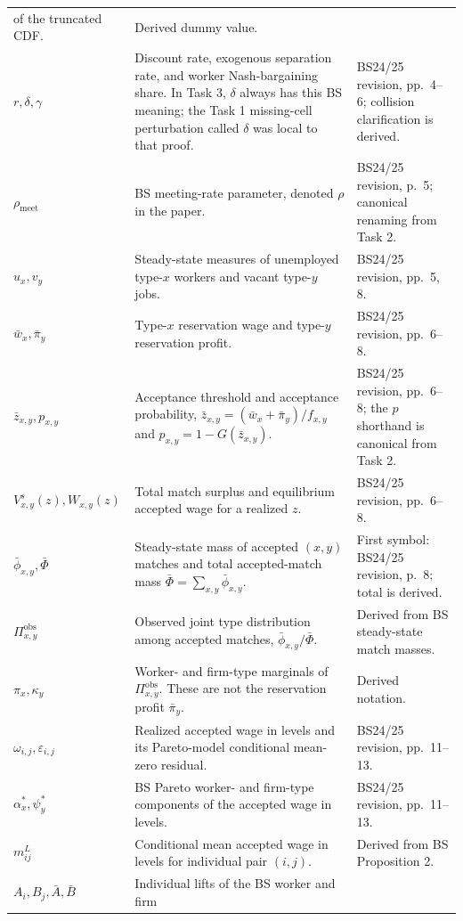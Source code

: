 \documentclass[11pt]{article}
\begin{document}
\begin{longtable}{p{}p{}p{}}
of the truncated CDF. & Derived dummy value. \\
\(r,\delta,\gamma\) & Discount rate, exogenous separation rate, and worker
Nash-bargaining share.  In Task 3, \(\delta\) always has this BS meaning; the
Task 1 missing-cell perturbation called \(\delta\) was local to that proof. &
BS24/25 revision, pp.\ 4--6; collision clarification is derived. \\
\(\rho_{\mathrm{meet}}\) & BS meeting-rate parameter, denoted \(\rho\) in
the paper. & BS24/25 revision, p.\ 5; canonical renaming from Task 2. \\
\(u_x,v_y\) & Steady-state measures of unemployed type-\(x\) workers and
vacant type-\(y\) jobs. & BS24/25 revision, pp.\ 5, 8. \\
\(\bar w_x,\bar\pi_y\) & Type-\(x\) reservation wage and type-\(y\)
reservation profit. & BS24/25 revision, pp.\ 6--8. \\
\(\bar z_{x,y},p_{x,y}\) & Acceptance threshold and acceptance probability,
\(\bar z_{x,y}=(\bar w_x+\bar\pi_y)/f_{x,y}\) and
\(p_{x,y}=1-G(\bar z_{x,y})\). & BS24/25 revision, pp.\ 6--8; the \(p\)
shorthand is canonical from Task 2. \\
\(V^s_{x,y}(z),W_{x,y}(z)\) & Total match surplus and equilibrium accepted
wage for a realized \(z\). & BS24/25 revision, pp.\ 6--8. \\
\(\bar\phi_{x,y},\bar\Phi\) & Steady-state mass of accepted \((x,y)\)
matches and total accepted-match mass
\(\bar\Phi=\sum_{x,y}\bar\phi_{x,y}\). & First symbol: BS24/25 revision,
p.\ 8; total is derived. \\
\(\Pi^{\mathrm{obs}}_{x,y}\) & Observed joint type distribution among
accepted matches, \(\bar\phi_{x,y}/\bar\Phi\). & Derived from BS steady-state
match masses. \\
\(\pi_x,\kappa_y\) & Worker- and firm-type marginals of
\(\Pi^{\mathrm{obs}}_{x,y}\).  These are not the reservation profit
\(\bar\pi_y\). & Derived notation. \\
\(\omega_{i,j},\varepsilon_{i,j}\) & Realized accepted wage in levels and
its Pareto-model conditional mean-zero residual. & BS24/25 revision,
pp.\ 11--13. \\
\(\alpha_x^*,\psi_y^*\) & BS Pareto worker- and firm-type components of the
accepted wage in levels. & BS24/25 revision, pp.\ 11--13. \\
\(m^{L}_{ij}\) & Conditional mean accepted wage in levels for individual
pair \((i,j)\). & Derived from BS Proposition 2. \\
\(A_i,B_j,\bar A,\bar B\) & Individual lifts of the BS worker and firm

\end{longtable}
\end{document}
